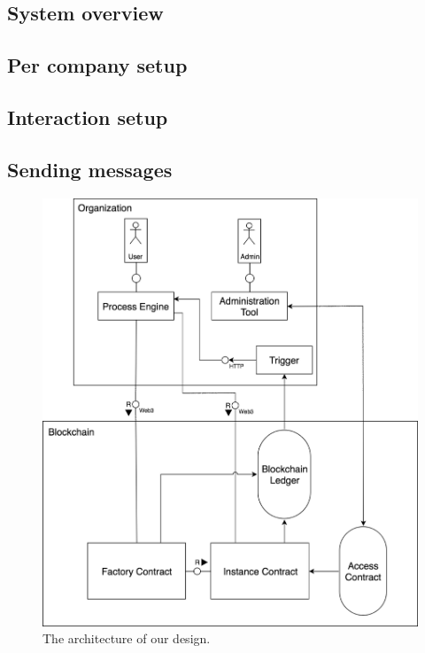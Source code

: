 \documentclass[runningheads]{llncs}
\begin{document}
\subsection{System overview}

\subsection{Per company setup}

\subsection{Interaction setup}

\subsection{Sending messages}

\begin{figure}
\includegraphics[width=\textwidth]{fig/system_diagram.eps}
\caption{The architecture of our design.} \label{fig1}
\end{figure}
\end{document}
